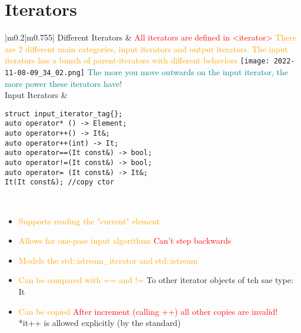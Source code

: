\documentclass[main.tex,fontsize=8pt,paper=a4,paper=portrait,DIV=calc]{scrartcl}
\begin{document}
\begin{table}[ht!]
\section{Iterators}
\begin{tabular}{|m{0.2\linewidth}|m{0.755\linewidth}|}
\hline
Different Iterators & 
\textcolor{red}{All iterators are defined in <iterator>}\newline
\textcolor{orange}{There are 2 different main categories, input iterators and output iterators.\newline
The input iterators has a bunch of parent-iterators with different behaviors}\newline
\texttt{[image: 2022-11-08-09\_34\_02.png]}\newline
\textcolor{teal}{The more you move outwards on the input iterator, the more power these iterators have!}\\
\hline
Input Iterators & 
\begin{lstlisting}
struct input_iterator_tag{};
auto operator* () -> Element;
auto operator++() -> It&;
auto operator++(int) -> It;
auto operator==(It const&) -> bool;
auto operator!=(It const&) -> bool;
auto operator= (It const&) -> It&;
It(It const&); //copy ctor
\end{lstlisting} 
\, \newline
\begin{itemize}
\item \textcolor{orange}{Supports reading the "current" element}
\item \textcolor{orange}{Allows for one-pass input algorithms}\newline
  \textcolor{red}{Can't step backwards}
\item \textcolor{orange}{Models the std::istream\_iterator and std::istream}
\item \textcolor{orange}{Can be compared with == and !=}\newline
  To other iterator objects of teh sae type: It
\item \textcolor{orange}{Can be copied}\newline
  \textcolor{red}{After increment (calling ++) all other copies are invalid!}\newline
  *it++ is allowed explicitly (by the standard)
\vspace{-2mm}
\end{itemize}\\
\hline
\end{tabular}
\end{table}
\pagebreak
\end{document}
